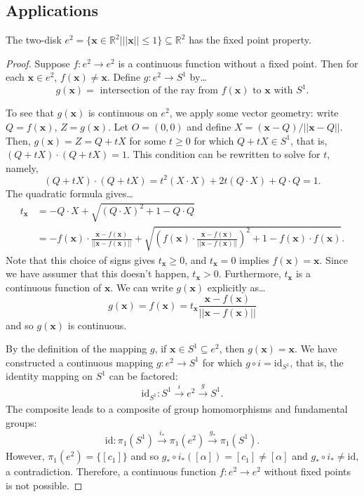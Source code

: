 \subsection{Applications}\label{homotopyapplications}

\begin{theorem}
The two-disk $e^2 = \{ \textbf{x} \in \mathbb{R}^2 | ||\textbf{x}|| \leq 1 \} \subseteq \mathbb{R}^2$
has the fixed point property.
\end{theorem}

\begin{proof}
Suppose $f : e^2 \rightarrow e^2$ is a continuous function without a fixed point. Then for each $\textbf{x} \in e^2$, $f(\textbf{x}) \neq \textbf{x}$.
Define $g : e^2 \rightarrow S^1$ by\dots
$$g(\textbf{x}) = \textrm{ intersection of the ray from } f(\textbf{x}) \textrm{ to } \textbf{x} \textrm{ with } S^1.$$

To see that $g(\textbf{x})$ is continuous on $e^2$, we apply some vector geometry: write $Q = f(\textbf{x})$, $Z = g(\textbf{x})$. Let $O = (0,0)$ and define
$X = (\textbf{x} - Q)/||\textbf{x} - Q||.$ Then, $g(\textbf{x}) = Z = Q + tX$ for some $t \geq 0$ for which $Q + tX \in S^1$, that is, $(Q + tX) \cdot (Q + tX) = 1.$
This condition can be rewritten to solve for $t$, namely,
$$(Q + tX) \cdot (Q + tX) = t^2(X \cdot X) + 2t(Q \cdot X) + Q \cdot Q = 1.$$
The quadratic formula gives\dots
\begin{align*}
t_{\textbf{x}} &= - Q \cdot X + \sqrt{(Q \cdot X)^2 + 1 - Q \cdot Q}\\
			   &= -f(\textbf{x}) \cdot \frac{\textbf{x} - f(\textbf{x})}{||\textbf{x} - f(\textbf{x})||} + \sqrt{\left(f(\textbf{x}) \cdot \frac{\textbf{x} - f(\textbf{x})}{||\textbf{x} - f(\textbf{x})||}\right)^2 + 1 - f(\textbf{x}) \cdot f(\textbf{x})}.
\end{align*}
Note that this choice of signs gives $t_{\textbf{x}} \geq 0$, and $t_{\textbf{x}} = 0$ implies $f(\textbf{x}) = \textbf{x}$. Since we have
assumer that this doesn't happen, $t_{\textbf{x}} > 0$. Furthermore, $t_{\textbf{x}}$ is a continuous function of $\textbf{x}$. We can write
$g(\textbf{x})$ explicitly as\dots
$$g(\textbf{x}) = f(\textbf{x}) = t_{\textbf{x}}\frac{\textbf{x} - f(\textbf{x})}{||\textbf{x} - f(\textbf{x})||}$$
and so $g(\textbf{x})$ is continuous.

By the definition of the mapping $g$, if $\textbf{x} \in S^1 \subseteq e^2$, then $g(\textbf{x}) = \textbf{x}.$
We have constructed a continuous mapping $g : e^2 \rightarrow S^1$ for which $g \circ i = \textrm{id}_{S^1}$, that is,
the identity mapping on $S^1$ can be factored:
$$\textrm{id}_{S^1} : S^1 \xrightarrow[]{i} e^2 \xrightarrow[]{g} S^1.$$
The composite leads to a composite of group homomorphisms and fundamental groups:
$$\textrm{id} : \pi_1(S^1) \xrightarrow[]{i_*} \pi_1(e^2) \xrightarrow[]{g_*} \pi_1(S^1).$$
However, $\pi_1(e^2) = \{ [c_1] \}$ and so $g_* \circ i_*([\alpha]) = [c_1] \neq [\alpha]$ and $g_* \circ i_* \neq \textrm{id}$,
a contradiction. Therefore, a continuous function $f : e^2 \rightarrow e^2$ without fixed points is not possible.
\end{proof}

